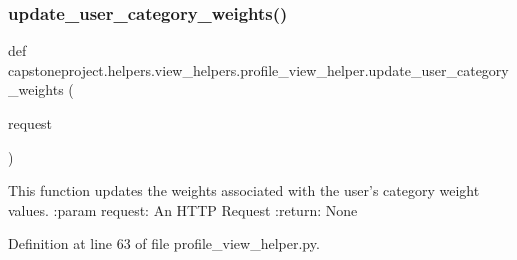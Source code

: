 \subsubsection{\texorpdfstring{update\+\_\+user\+\_\+category\+\_\+weights()}{update\_user\_category\_weights()}}
{\footnotesize\ttfamily def capstoneproject.\+helpers.\+view\+\_\+helpers.\+profile\+\_\+view\+\_\+helper.\+update\+\_\+user\+\_\+category\+\_\+weights (\begin{DoxyParamCaption}\item[{}]{request }\end{DoxyParamCaption})}

\begin{DoxyVerb}This function updates the weights associated with the user's
category weight values.
:param request: An HTTP Request
:return: None
\end{DoxyVerb}
 

Definition at line 63 of file profile\+\_\+view\+\_\+helper.\+py.

